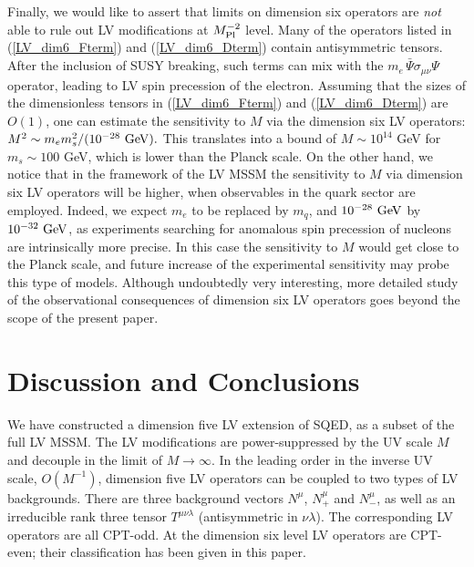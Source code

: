 \documentclass[12pt]{revtex4}
\begin{document}
Finally, we would like to assert that limits on dimension six operators 
are {\em not} able to rule out LV modifications at $M^{-2}_{\rm Pl}$ level. 
Many of the operators listed in (\ref{LV_dim6_Fterm}) and
(\ref{LV_dim6_Dterm}) contain antisymmetric tensors.  After the
inclusion of SUSY breaking, such terms can mix with the
$m_e\, \bar \Psi \sigma_{\mu\nu} \Psi$ operator, leading to 
LV spin precession of the electron. Assuming that the sizes of the
dimensionless tensors in (\ref{LV_dim6_Fterm}) and
(\ref{LV_dim6_Dterm}) are $O(1)$, one can estimate the sensitivity to $M$
via the dimension six LV operators:  
$M^2 \sim m_em_s^2/(10^{-28}~{\rm GeV}). $
This translates into a bound of $M \sim 10^{14}$ GeV for $m_s \sim
100$ GeV, which is lower than the Planck scale. On the other hand, we
notice that in the framework of the LV MSSM the sensitivity to $M$ via
dimension six LV operators will be higher, when observables in the
quark sector are employed. Indeed, we expect $m_e$ to be replaced 
by $m_q$, and $10^{-28}~{\rm GeV}$ by $10^{-32}~{\rm GeV}$, as 
experiments searching for anomalous spin precession of nucleons are
intrinsically more precise.  In this case the sensitivity to $M$
would get close to the Planck scale, and future increase of the
experimental sensitivity  may probe this type of models. Although
undoubtedly very interesting, more detailed study of the observational
consequences of  dimension six LV operators goes beyond the scope of
the present paper.  



\section{Discussion and Conclusions}
\label{conclusion} 


We have constructed a dimension five LV extension of SQED, 
as a subset of the full LV MSSM. The LV modifications are 
power-suppressed by the UV scale $M$ and decouple in the limit of
$M\to\infty$.  In the leading order in the inverse UV scale, $O(M^{-1})$, 
dimension five LV operators can be coupled to two types of LV
backgrounds. There are three background vectors  
$N^\mu$, $N^\mu_+$ and $N^{\mu}_-$, as well as an irreducible rank
three tensor $T^{\mu\nu\lambda}$ (antisymmetric in $\nu\lambda$). The
corresponding LV operators are all CPT-odd. At the dimension six level
LV operators are CPT-even; their classification has been given in 
this paper. 
\end{document}
